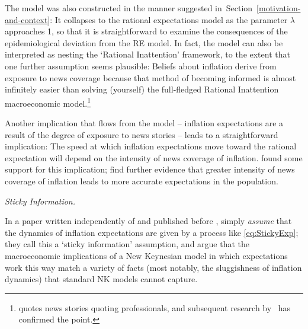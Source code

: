 The model was also constructed in the manner suggested in~Section~\ref{motivation-and-context}: It collapses to the rational expectations model as the parameter $\lambda$ approaches 1, so that it is straightforward to examine the consequences of the epidemiological deviation from the RE model.  In fact, the model can also be interpreted as nesting the `Rational Inattention' framework, to the extent that one further assumption seems plausible:  Beliefs about inflation derive from exposure to news coverage because that method of becoming informed is almost infinitely easier than solving (yourself) the full-fledged Rational Inattention macroeconomic model.\footnote{\cite{carroll2003macroeconomic} quotes news stories quoting professionals, and subsequent research by~\cite{lamla2014role} has confirmed the point.}

Another implication that flows from the model -- inflation expectations are a result of the degree of exposure to news stories -- leads to a straightforward implication:  The speed at which inflation expectations move toward the rational expectation will depend on the intensity of news coverage of inflation.  \cite{carroll2003macroeconomic} found some support for this implication; \cite{lamla2014role} find further evidence that greater intensity of news coverage of inflation leads to more accurate expectations in the population.



\medskip
\noindent\textit{Sticky Information.}

In a paper written independently of and published before \cite{carroll2003macroeconomic}, \cite{mr2002Sticky} simply \textit{assume} that the dynamics of inflation expectations are given by a process like \eqref{eq:StickyExp}; they call this a `sticky information' assumption, and argue that the macroeconomic implications of a New Keynesian model in which expectations work this way match a variety of facts (most notably, the sluggishness of inflation dynamics) that standard NK models cannot capture.

